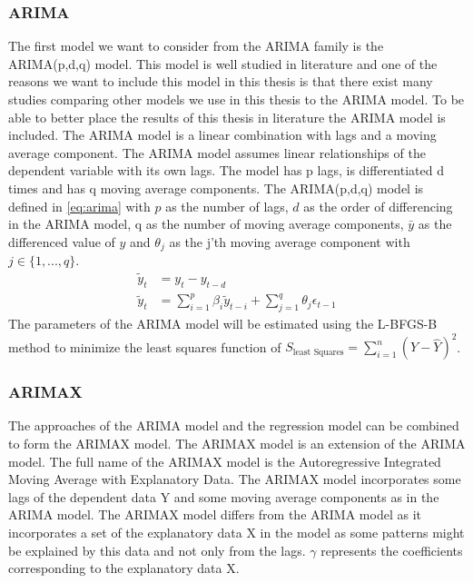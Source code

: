 \subsubsection{ARIMA}
\label{subsec:arima}
The first model we want to consider from the ARIMA family is the ARIMA(p,d,q) model. This model is well studied in literature and one of the reasons we want to include this model in this thesis is that there exist many studies comparing other models we use in this thesis to the ARIMA model. To be able to better place the results of this thesis in literature the ARIMA model is included. The ARIMA model is a linear combination with lags and a moving average component. The ARIMA model assumes linear relationships of the dependent variable with its own lags. The model has p lags, is differentiated d times and has q moving average components. The ARIMA(p,d,q) model is defined in \autoref{eq:arima} with $p$ as the number of lags, $d$ as the order of differencing in the ARIMA model, q as the number of moving average components, $\bar{y}$ as the differenced value of $y$ and $\theta_j$ as the j'th moving average component with $j \in \{1, ..., q\}$.
\begin{equation}
\begin{split}
    \tilde{y}_t &= y_t - y_{t-d}\\
    \tilde{y}_t &= \sum\limits_{i=1}^p \beta_i \tilde{y}_{t-i}  + \sum\limits_{j=1}^q \theta_j \epsilon_{t-1}
\label{eq:arima}
\end{split}
\end{equation}
The parameters of the ARIMA model will be estimated using the L-BFGS-B method \citep{L-BFGS-B} to minimize the least squares function of $S_{\text{least Squares}} = \sum^n_{i=1} (Y - \hat{Y})^2$.

\subsubsection{ARIMAX}
\label{subsec:arimax}
The approaches of the ARIMA model and the regression model can be combined to form the ARIMAX model. The ARIMAX model is an extension of the ARIMA model. The full name of the ARIMAX model is the Autoregressive Integrated Moving Average with Explanatory Data. The ARIMAX model incorporates some lags of the dependent data Y and some moving average components as in the ARIMA model. The ARIMAX model differs from the ARIMA model as it incorporates a set of the explanatory data X in the model as some patterns might be explained by this data and not only from the lags. $\gamma$ represents the coefficients corresponding to the explanatory data X.\\

